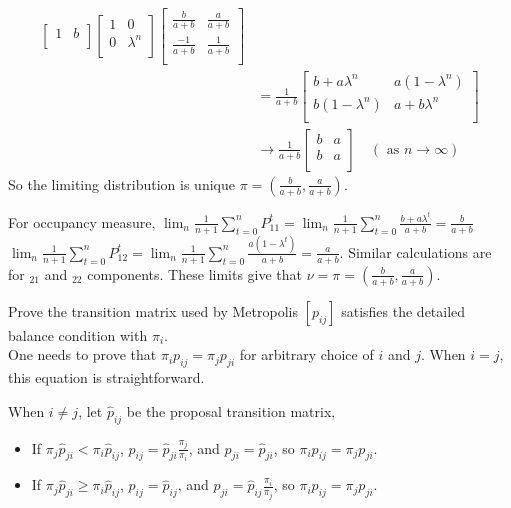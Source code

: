 \documentclass[  11pt]{article}
\begin{document}
\begin{ExerciseList}
\[\begin{split}
\begin{bmatrix}
1 & b \\
\end{bmatrix} 
\begin{bmatrix}
1 & 0 \\
0 & \lambda^n \\
\end{bmatrix}
\begin{bmatrix}
\frac{b}{a+b} & \frac{a}{a+b} \\
\frac{-1}{a+b} & \frac{1}{a+b} \\
\end{bmatrix}
\\
& = \frac{1}{a+b}\begin{bmatrix}
b+a\lambda^n & a(1-\lambda^n) \\
b(1-\lambda^n) & a+b\lambda^n \\
\end{bmatrix}
\\
& \to 
\frac{1}{a+b}\begin{bmatrix}
b  & a  \\
b  & a  \\
\end{bmatrix}
\quad ( \mbox{ as } n\to\infty)
\end{split}
\]
So the limiting distribution is unique $\pi=(\frac{b}{a+b},\frac{a}{a+b}).$

For occupancy measure, 
$ \lim_n \frac{1}{n+1}\sum_{t=0}^n P^{t}_{11}
= \lim_n \frac{1}{n+1}\sum_{t=0}^n \frac{b+a\lambda^t}{a+b}=\frac{b}{a+b}$
$ \lim_n \frac{1}{n+1}\sum_{t=0}^n P^{t}_{12}
= \lim_n \frac{1}{n+1}\sum_{t=0}^n \frac{a(1-\lambda^t)}{a+b}=\frac{a}{a+b}$.
Similar calculations are for $_{21}$ and $_{22}$ components.
These limits give that $\nu=\pi=(\frac{b}{a+b},\frac{a}{a+b}).$



\Exercise
 Prove the transition matrix used by Metropolis $ [{p}_{ij}]$ satisfies the detailed balance condition with $\pi_i$.\\

\Answer
One needs to prove that $\pi_i  {p_{ij}} = \pi_j  {p_{ji}}$ for arbitrary choice of $i$ and $j$.
When $i=j$, this equation is straightforward.\par
\par
When $i\neq j$, let $\hat{p}_{ij}$ be the proposal transition matrix, 
\begin{itemize}
\item If $\pi_j \hat{p}_{ji} < \pi_i \hat{p}_{ij}$, $ {p_{ij}} = \hat{p}_{ji}\frac{\pi_j}{\pi_i}$, and $ {p_{ji}} = \hat{p}_{ji}$, so  $\pi_i  {p_{ij}} = \pi_j  {p_{ji}}$.
\item If $\pi_j \hat{ p}_{ji} \geq \pi_i \hat{p}_{ij}$, $ {p_{ij}} = \hat{p}_{ij}$, and $ {p_{ji}} = \hat{p}_{ij}\frac{\pi_i}{\pi_j}$, so  $\pi_i  {p_{ij}} = \pi_j  {p_{ji}}$.
\end{itemize}


\end{ExerciseList}
\end{document}
